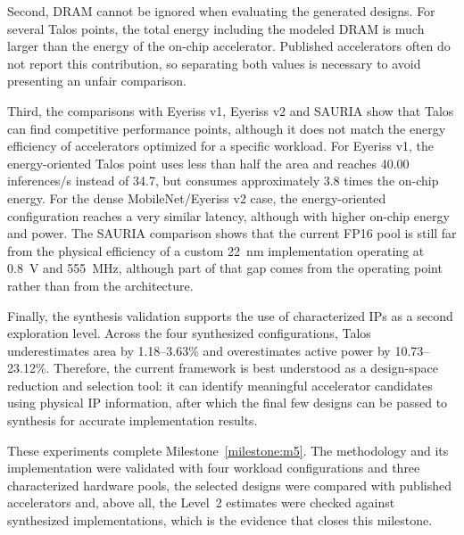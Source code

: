 Second, DRAM cannot be ignored when evaluating the generated designs.
For several Talos points, the total energy including the modeled DRAM is
much larger than the energy of the on-chip accelerator. Published
accelerators often do not report this contribution, so separating both
values is necessary to avoid presenting an unfair comparison.

Third, the comparisons with Eyeriss v1, Eyeriss v2 and SAURIA show
that Talos can find competitive performance points, although it does
not match the energy efficiency of accelerators optimized for a
specific workload. For Eyeriss v1, the energy-oriented Talos point
uses less than half the area and reaches 40.00 inferences/s instead of
34.7, but consumes approximately 3.8 times the on-chip energy. For the
dense MobileNet/Eyeriss v2 case, the energy-oriented configuration
reaches a very similar latency, although with higher on-chip energy and
power. The SAURIA comparison shows that the current FP16 pool is still
far from the physical efficiency of a custom 22~nm implementation
operating at 0.8~V and 555~MHz, although part of that gap comes from
the operating point rather than from the architecture.

Finally, the synthesis validation supports the use of characterized IPs
as a second exploration level. Across the four synthesized
configurations, Talos underestimates area by 1.18--3.63\% and
overestimates active power by 10.73--23.12\%. Therefore, the current
framework is best understood as a design-space reduction and selection
tool: it can identify meaningful accelerator candidates using physical
IP information, after which the final few designs can be passed to
synthesis for accurate implementation results.

These experiments complete Milestone~\ref{milestone:m5}. The
methodology and its implementation were validated with four workload
configurations and three characterized hardware pools, the selected
designs were compared with published accelerators and, above all, the
Level~2 estimates were checked against synthesized implementations,
which is the evidence that closes this milestone.
